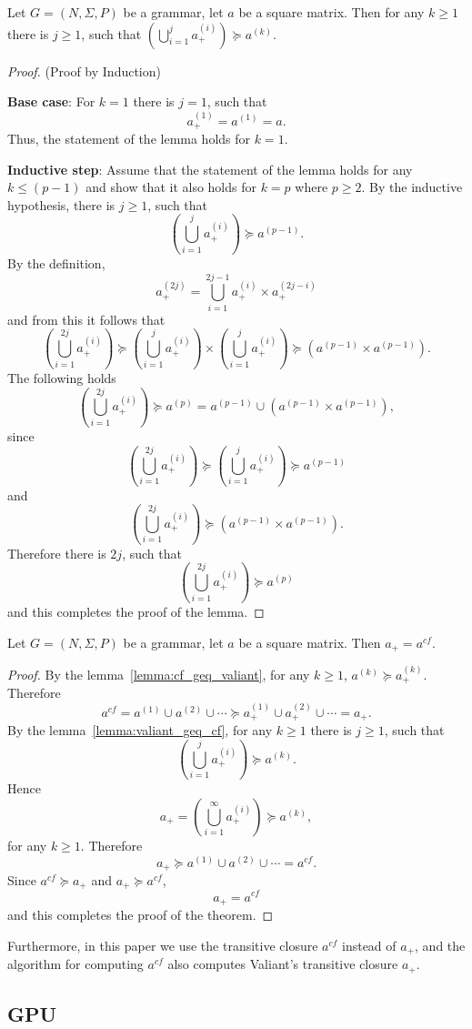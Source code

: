 \begin{lemma}\label{lemma:valiant_geq_cf}
	Let $G =(N,\Sigma,P)$ be a grammar, let $a$ be a square matrix. Then for any $k \geq 1$ there is $j \geq 1$, such that $(\bigcup^{j}_{i=1}{a^{(i)}_+}) \succeq a^{(k)}$.
\end{lemma}
\begin{proof}(Proof by Induction)
	
	\textbf{Base case}: For $k = 1$ there is $j = 1$, such that $$a^{(1)}_+ = a^{(1)} = a.$$ Thus, the statement of the lemma holds for $k = 1$.
	
	\textbf{Inductive step}: Assume that the statement of the lemma holds for any $k \leq (p - 1)$ and show that it also holds for $k = p$ where $p \geq 2$. By the inductive hypothesis, there is $j \geq 1$, such that $$(\bigcup^{j}_{i=1}{a^{(i)}_+}) \succeq a^{(p-1)}.$$ By the definition, $$a^{(2j)}_+ = \bigcup^{2j-1}_{i=1}{a^{(i)}_+ \times a^{(2j-i)}_+}$$ and from this it follows that $$(\bigcup^{2j}_{i=1}{a^{(i)}_+}) \succeq (\bigcup^{j}_{i=1}{a^{(i)}_+}) \times (\bigcup^{j}_{i=1}{a^{(i)}_+}) \succeq (a^{(p-1)} \times a^{(p-1)}).$$ The following holds $$(\bigcup^{2j}_{i=1}{a^{(i)}_+}) \succeq a^{(p)} = a^{(p-1)} \cup (a^{(p-1)} \times a^{(p-1)}),$$ since $$(\bigcup^{2j}_{i=1}{a^{(i)}_+}) \succeq (\bigcup^{j}_{i=1}{a^{(i)}_+}) \succeq a^{(p-1)}$$ and $$(\bigcup^{2j}_{i=1}{a^{(i)}_+}) \succeq (a^{(p-1)} \times a^{(p-1)}).$$ Therefore there is $2j$, such that $$(\bigcup^{2j}_{i=1}{a^{(i)}_+}) \succeq a^{(p)}$$ and this completes the proof of the lemma.	
\end{proof}

\begin{mytheorem}\label{thm:closures}
	Let $G =(N,\Sigma,P)$ be a grammar, let $a$ be a square matrix. Then $a_+ = a^{cf}$.
\end{mytheorem}
\begin{proof}
	
	By the lemma~\ref{lemma:cf_geq_valiant}, for any $k \geq 1$, $a^{(k)} \succeq a^{(k)}_+$. Therefore $$a^{cf} = a^{(1)} \cup a^{(2)} \cup \cdots \succeq a^{(1)}_+ \cup a^{(2)}_+ \cup \cdots = a_+.$$ By the lemma~\ref{lemma:valiant_geq_cf}, for any $k \geq 1$ there is $j \geq 1$, such that $$(\bigcup^{j}_{i=1}{a^{(i)}_+}) \succeq a^{(k)}.$$ Hence $$a_+ = (\bigcup^{\infty}_{i=1}{a^{(i)}_+}) \succeq a^{(k)},$$ for any $k \geq 1$. Therefore $$a_+ \succeq a^{(1)} \cup a^{(2)} \cup \cdots = a^{cf}.$$ Since $a^{cf} \succeq a_+$ and $a_+ \succeq a^{cf}$, $$a_+ = a^{cf}$$ and this completes the proof of the theorem.
\end{proof}

Furthermore, in this paper we use the transitive closure $a^{cf}$ instead of $a_+$, and the algorithm for computing $a^{cf}$ also computes Valiant's transitive closure $a_+$.

\subsection{GPU}